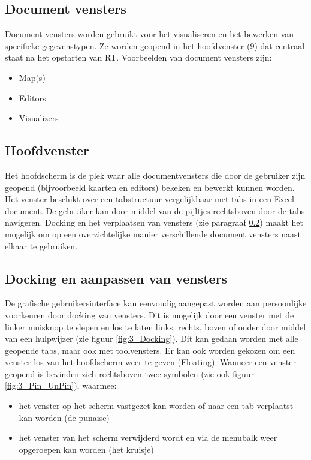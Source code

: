 \subsection*{Document vensters}
Document vensters worden gebruikt voor het visualiseren en het bewerken van specifieke gegevenstypen. Ze worden geopend in het hoofdvenster (9) dat centraal staat na het opstarten van RT. Voorbeelden van document vensters zijn:
\begin{itemize}
\item Map(s)
\item Editors
\item Visualizers
\end{itemize}


\subsection{Hoofdvenster}
Het hoofdscherm is de plek waar alle documentvensters die door de gebruiker zijn geopend (bijvoorbeeld kaarten en editors) bekeken en bewerkt kunnen worden. Het venster beschikt over een tabstructuur vergelijkbaar met tabs in een Excel document. De gebruiker kan door middel van de pijltjes rechtsboven door de tabs navigeren. Docking en het verplaatsen van vensters (zie paragraaf \ref{sec:RT_Docking}) maakt het mogelijk om op een overzichtelijke manier verschillende document vensters naast elkaar te gebruiken.

\subsection{Docking en aanpassen van vensters}
\label{sec:RT_Docking}
De grafische gebruikersinterface kan eenvoudig aangepast worden aan persoonlijke voorkeuren door docking van vensters. Dit is mogelijk door een venster met de linker muisknop te slepen en los te laten links, rechts, boven of onder door middel van een hulpwijzer (zie figuur \ref{fig:3_Docking}). Dit kan gedaan worden met alle geopende tabs, maar ook met toolvensters. Er kan ook worden gekozen om een venster los van het hoofdscherm weer te geven (Floating). Wanneer een venster geopend is bevinden zich rechtsboven twee symbolen (zie ook figuur \ref{fig:3_Pin_UnPin}), waarmee:
\begin{itemize}
\item het venster op het scherm vastgezet kan worden of naar een tab verplaatst kan worden (de punaise)
\item het venster van het scherm verwijderd wordt en via de menubalk weer opgeroepen kan worden (het kruisje)
\end{itemize}

